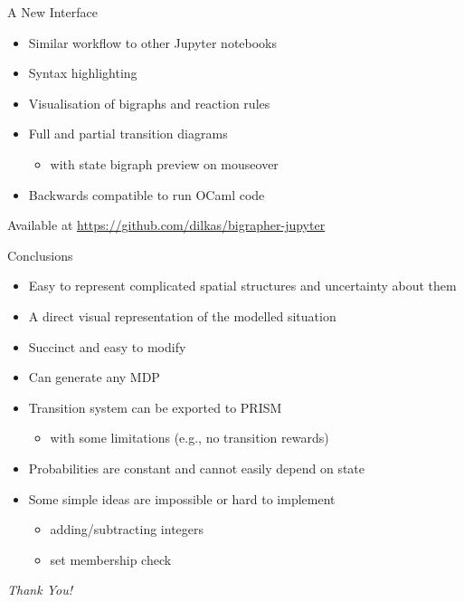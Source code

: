 \documentclass{beamer}
\newcommand\pro{\item[\textcolor{green}{$+$}]}
\newcommand\con{\item[\textcolor{red}{$-$}]}
\begin{document}
\begin{frame}{A New Interface}
  \begin{itemize}
  \item Similar workflow to other Jupyter notebooks
  \item Syntax highlighting
  \item Visualisation of bigraphs and reaction rules
  \item Full and partial transition diagrams
    \begin{itemize}
    \item with state bigraph preview on mouseover
    \end{itemize}
  \item Backwards compatible to run OCaml code
  \end{itemize}
  \begin{block}{Available at}
    \url{https://github.com/dilkas/bigrapher-jupyter}
  \end{block}
\end{frame}


\begin{frame}{Conclusions}
  \begin{itemize}
    \pro Easy to represent complicated spatial structures and uncertainty about
    them
    \pause
    \pro A direct visual representation of the modelled situation
    \pause
    \pro Succinct and easy to modify
    \pause
    \pro Can generate any MDP
    \pause
    \pro Transition system can be exported to PRISM
    \begin{itemize}
      \con with some limitations (e.g., no transition rewards)
    \end{itemize}
    \pause
    \con Probabilities are constant and cannot easily depend on state
    \pause
    \con Some simple ideas are impossible or hard to implement
    \begin{itemize}
    \item adding/subtracting integers
    \item set membership check
    \end{itemize}
  \end{itemize}
  \pause
  \centering
  \large
  \emph{Thank You!}
\end{frame}
\end{document}
